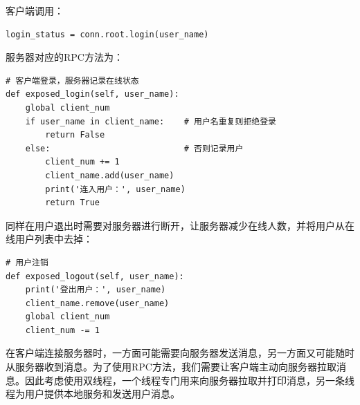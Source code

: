 \documentclass{report}
\begin{document}
客户端调用：
\begin{lstlisting}
login_status = conn.root.login(user_name)
\end{lstlisting}
服务器对应的RPC方法为：
\begin{lstlisting}
# 客户端登录，服务器记录在线状态        
def exposed_login(self, user_name):
    global client_num
    if user_name in client_name:    # 用户名重复则拒绝登录
        return False
    else:                           # 否则记录用户
        client_num += 1
        client_name.add(user_name)
        print('连入用户：', user_name)
        return True
\end{lstlisting}
同样在用户退出时需要对服务器进行断开，让服务器减少在线人数，并将用户从在线用户列表中去掉：
\begin{lstlisting}
# 用户注销
def exposed_logout(self, user_name):
    print('登出用户：', user_name)
    client_name.remove(user_name)
    global client_num
    client_num -= 1
\end{lstlisting}
在客户端连接服务器时，一方面可能需要向服务器发送消息，另一方面又可能随时从服务器收到消息。为了使用RPC方法，我们需要让客户端主动向服务器拉取消息。因此考虑使用双线程，一个线程专门用来向服务器拉取并打印消息，另一条线程为用户提供本地服务和发送用户消息。
\end{document}
